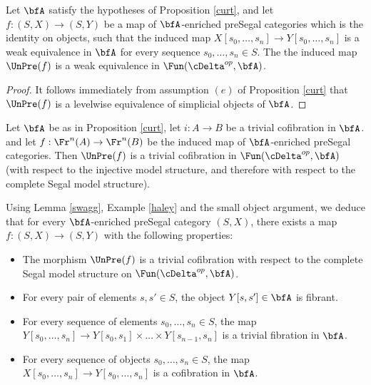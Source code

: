 \begin{lemma}
Let $\bfA$ satisfy the hypotheses of Proposition \ref{curt}, and let
$f: (S,X) \rightarrow (S,Y)$ be a map of $\bfA$-enriched preSegal categories
which is the identity on objects, such that the induced map
$X[ s_0, \ldots, s_n] \rightarrow Y[s_0, \ldots, s_n]$ is a weak equivalence in
$\bfA$ for every sequence $s_0, \ldots, s_n \in S$. The the induced map
$\UnPre(f)$ is a weak equivalence in $\Fun( \cDelta^{op}, \bfA)$.
\end{lemma}

\begin{proof}
It follows immediately from assumption $(e)$ of Proposition \ref{curt} that
$\UnPre(f)$ is a levelwise equivalence of simplicial objects of $\bfA$.
\end{proof}

\begin{example}\label{haley}
Let $\bfA$ be as in Proposition \ref{curt}, let
$i: A \rightarrow B$ be a trivial cofibration in $\bfA$. and let
$f: \Fr^{n}(A) \rightarrow \Fr^{n}(B)$ be the induced map of
$\bfA$-enriched preSegal categories. Then $\UnPre(f)$ is a trivial
cofibration in $\Fun( \cDelta^{op}, \bfA)$ (with respect to the injective model structure,
and therefore with respect to the complete Segal model structure).
\end{example}

\begin{remark}\label{sinker}
Using Lemma \ref{swagg}, Example \ref{haley} and the small object argument, we deduce that
for every $\bfA$-enriched preSegal category $(S,X)$, there exists a map
$f: (S,X) \rightarrow (S,Y)$ with the following properties:
\begin{itemize}
\item[$(i)$] The morphism $\UnPre(f)$ is a trivial cofibration with respect
to the complete Segal model structure on $\Fun( \cDelta^{op}, \bfA)$.
\item[$(ii)$] For every pair of elements $s,s' \in S$, the object
$Y[s,s'] \in \bfA$ is fibrant.
\item[$(iii)$] For every sequence of elements $s_0, \ldots, s_n \in S$, the map
$Y[s_0, \ldots, s_n] \rightarrow Y[s_0, s_1] \times \ldots \times Y[s_{n-1}, s_n]$
is a trivial fibration in $\bfA$.
\item[$(iv)$] For every sequence of objects $s_0, \ldots, s_n \in S$, the map
$X[s_0, \ldots, s_n] \rightarrow Y[s_0, \ldots, s_n]$ is a cofibration in $\bfA$.
\end{itemize}
\end{remark}


